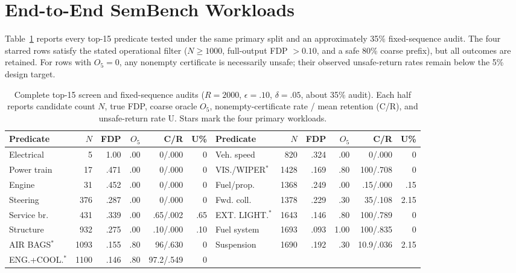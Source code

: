 \documentclass[runningheads]{llncs}
\begin{document}
\section{End-to-End SemBench Workloads}
Table~\ref{tab:predicate-screen} reports every top-15 predicate tested under the same primary split and an approximately 35\% fixed-sequence audit. The four starred rows satisfy the stated operational filter ($N\ge1000$, full-output FDP $>0.10$, and a safe 80\% coarse prefix), but all outcomes are retained. For rows with $O_5=0$, any nonempty certificate is necessarily unsafe; their observed unsafe-return rates remain below the 5\% design target.

\begin{table}[H]
\centering
\scriptsize
\caption{Complete top-15 screen and fixed-sequence audits ($R=2000$, $\epsilon=.10$, $\delta=.05$, about 35\% audit). Each half reports candidate count $N$, true FDP, coarse oracle $O_5$, nonempty-certificate rate / mean retention (C/R), and unsafe-return rate U. Stars mark the four primary workloads.}
\label{tab:predicate-screen}
\setlength{\tabcolsep}{2pt}
\begin{tabular}{@{}lrrrrr@{\hspace{3pt}}lrrrrr@{}}
\toprule
Predicate & $N$ & FDP & $O_5$ & C/R & U\% & Predicate & $N$ & FDP & $O_5$ & C/R & U\%\\
\midrule
Electrical & 5 & 1.00 & .00 & 0/.000 & 0 & Veh. speed & 820 & .324 & .00 & 0/.000 & 0\\
Power train & 17 & .471 & .00 & 0/.000 & 0 & VIS./WIPER$^*$ & 1428 & .169 & .80 & 100/.708 & 0\\
Engine & 31 & .452 & .00 & 0/.000 & 0 & Fuel/prop. & 1368 & .249 & .00 & .15/.000 & .15\\
Steering & 376 & .287 & .00 & 0/.000 & 0 & Fwd. coll. & 1378 & .229 & .30 & 35/.108 & 2.15\\
Service br. & 431 & .339 & .00 & .65/.002 & .65 & EXT. LIGHT.$^*$ & 1643 & .146 & .80 & 100/.789 & 0\\
Structure & 932 & .275 & .00 & .10/.000 & .10 & Fuel system & 1693 & .093 & 1.00 & 100/.835 & 0\\
AIR BAGS$^*$ & 1093 & .155 & .80 & 96/.630 & 0 & Suspension & 1690 & .192 & .30 & 10.9/.036 & 2.15\\
ENG.+COOL.$^*$ & 1100 & .146 & .80 & 97.2/.549 & 0 & & & & & &\\
\bottomrule
\end{tabular}
\end{table}
\setlength{\tabcolsep}{6pt}
\end{document}
